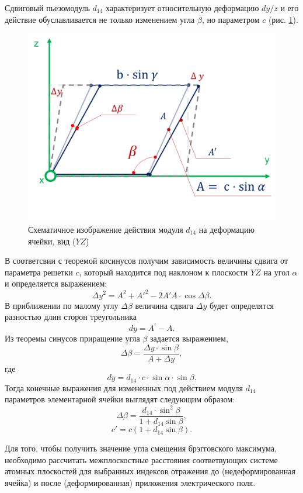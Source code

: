 Сдвиговый пьезомодуль $d_{14}$ характеризует относительную деформацию $dy/z$ и
его действие обуславливается не только
изменением угла $\beta$, но параметром $c$ (рис. \ref{ris:d14}).
\begin{figure}[H]
  \centering
  \includegraphics[width=.6\textwidth]{images/d14.png}
  \caption{Схематичное изображение действия модуля $d_{14}$ на деформацию ячейки, вид ($YZ$)}
  \label{ris:d14}
\end{figure}
В соответсвии с теоремой косинусов получим зависимость величины сдвига от параметра решетки $c$,
который находится под наклоном к плоскости $YZ$ на угол $\alpha$ и определяется выражением:
$$
    \Delta y^2 = A^2 + A{'}^2 - 2 A{'}A \cdot \cos \Delta \beta.
$$
В приближении по малому углу $\Delta \beta$ величина сдвига $\Delta y$ будет
определятся разностью длин сторон треугольника
$$
  dy = A^{'} - A.
$$
Из теоремы синусов приращение угла $\beta$ задается выражением,
$$
\Delta \beta = \frac{\Delta y \cdot\sin \beta}{ A+ \Delta y },
$$
\noindent
где
$$
dy = d_{14} \cdot c \cdot \sin \alpha \cdot \sin \beta.
$$
Тогда конечные выражения для измененных под действием модуля $d_{14}$ параметров элементарной ячейки
выглядят следующим образом:
\begin{equation}
   \Delta \beta = \frac{d_{14} \cdot \sin^2\beta}{1+d_{14}\sin \beta},
   \label{eq:b_formed_5}
\end{equation}
\begin{equation}
   c{'} = c(1+d_{14}\sin\beta).
   \label{eq:b_formed_6}
\end{equation}

Для того, чтобы получить значение угла смещения брэгговского максимума,
необходимо рассчитать межплоскостные расстояния соответвующих системе атомных плоскостей
 для выбранных индексов отражения
до (недеформированная ячейка) и после (деформированная) приложения электрического
поля.

